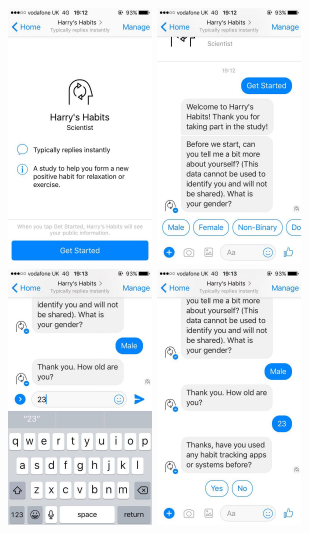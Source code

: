 \begin{figure}[H]
  \centering
  \includegraphics[width=1.5in]{resources/design/process/1.jpg}
  \hspace{10px}
  \includegraphics[width=1.5in]{resources/design/process/2.jpg}
  \hspace{10px}
  \includegraphics[width=1.5in]{resources/design/process/3.jpg}
  \hspace{10px}
  \includegraphics[width=1.5in]{resources/design/process/4.jpg}

\end{figure}
